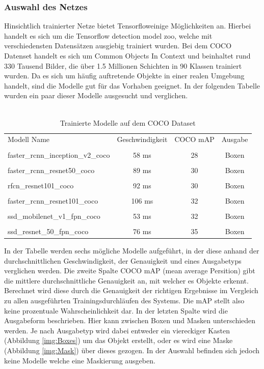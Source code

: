 \documentclass[a4paper,12pt,oneside]{article}
\begin{document}
  \subsubsection{Auswahl des Netzes} 
Hinsichtlich trainierter Netze bietet \glqq Tensorflow\grqq einige Möglichkeiten an. Hierbei handelt es sich um die \glqq Tensorflow detection model zoo\grqq \cite{google2018zoo}, welche mit verschiedensten Datensätzen ausgiebig trainiert wurden. Bei dem COCO Datenset handelt es sich um \glqq Common Objects In Context\grqq \cite{common2018data} und beinhaltet rund 330 Tausend Bilder, die über 1.5 Millionen Schichten in 90 Klassen trainiert wurden. Da es sich um häufig auftretende Objekte in einer realen Umgebung handelt, sind die Modelle gut für das Vorhaben geeignet. In der folgenden Tabelle wurden ein paar dieser Modelle ausgesucht und verglichen.
\\
\\

\begin{table}
[h]
\begin{tabular}{|l|c|c|c|}
 
Modell Name & Geschwindigkeit & COCO mAP & Ausgabe\\
 & & & \\
faster\_rcnn\_inception\_v2\_coco & 58 ms & 28 & Boxen\\
 & & & \\
faster\_rcnn\_resnet50\_coco & 89 ms & 30 & Boxen\\
 & & & \\
rfcn\_resnet101\_coco & 92 ms & 30 & Boxen\\
 & & & \\
faster\_rcnn\_resnet101\_coco & 106 ms & 32 & Boxen\\
 & & & \\
ssd\_mobilenet\_v1\_fpn\_coco & 53 ms & 32 & Boxen\\
 & & & \\
ssd\_resnet\_50\_fpn\_coco & 76 ms & 35 & Boxen

\vspace{0.5 cm}
 
\end{tabular}
\caption{Trainierte Modelle auf dem COCO Dataset \cite{google2018zoo}}
\end{table}


In der Tabelle werden sechs mögliche Modelle aufgeführt, in der diese anhand der durchschnittlichen Geschwindigkeit, der Genauigkeit und eines Ausgabetyps verglichen werden. Die zweite Spalte COCO mAP (mean average Persition) gibt die mittlere durchschnittliche Genauigkeit an, mit welcher es Objekte erkennt. Berechnet wird diese durch die Genauigkeit der richtigen Ergebnisse im Vergleich zu allen ausgeführten Trainingsdurchläufen des Systems. Die mAP stellt also keine prozentuale Wahrscheinlichkeit dar. In der letzten Spalte wird die Ausgabeform beschrieben. Hier kann zwischen Boxen und Masken unterschieden werden. Je nach Ausgabetyp wird dabei entweder ein viereckiger Kasten (Abbildung \ref{img:Boxes}) um das Objekt erstellt, oder es wird eine Maske (Abbildung \ref{img:Mask}) über dieses gezogen. In der Auswahl befinden sich jedoch keine Modelle welche eine Maskierung ausgeben.
\end{document}
